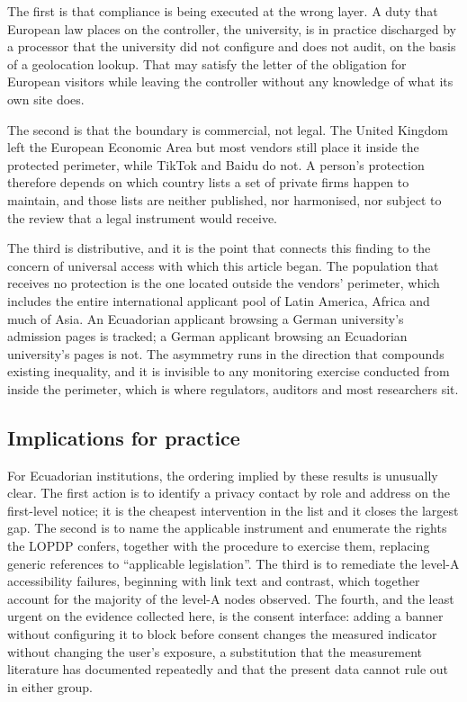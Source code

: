 \documentclass[pdflatex,sn-basic,Numbered]{sn-jnl}
\theoremstyle{thmstyleone}
\theoremstyle{thmstyletwo}
\theoremstyle{thmstylethree}
\begin{document}
The first is that compliance is being executed at the wrong layer. A duty that European law places on the controller, the university, is in practice discharged by a processor that the university did not configure and does not audit, on the basis of a geolocation lookup. That may satisfy the letter of the obligation for European visitors while leaving the controller without any knowledge of what its own site does.

The second is that the boundary is commercial, not legal. The United Kingdom left the European Economic Area but most vendors still place it inside the protected perimeter, while TikTok and Baidu do not. A person's protection therefore depends on which country lists a set of private firms happen to maintain, and those lists are neither published, nor harmonised, nor subject to the review that a legal instrument would receive.

The third is distributive, and it is the point that connects this finding to the concern of universal access with which this article began. The population that receives no protection is the one located outside the vendors' perimeter, which includes the entire international applicant pool of Latin America, Africa and much of Asia. An Ecuadorian applicant browsing a German university's admission pages is tracked; a German applicant browsing an Ecuadorian university's pages is not. The asymmetry runs in the direction that compounds existing inequality, and it is invisible to any monitoring exercise conducted from inside the perimeter, which is where regulators, auditors and most researchers sit.

\subsection{Implications for practice}\label{sec:discussion-practice}

For Ecuadorian institutions, the ordering implied by these results is unusually clear. The first action is to identify a privacy contact by role and address on the first-level notice; it is the cheapest intervention in the list and it closes the largest gap. The second is to name the applicable instrument and enumerate the rights the LOPDP confers, together with the procedure to exercise them, replacing generic references to ``applicable legislation''. The third is to remediate the level-A accessibility failures, beginning with link text and contrast, which together account for the majority of the level-A nodes observed. The fourth, and the least urgent on the evidence collected here, is the consent interface: adding a banner without configuring it to block before consent changes the measured indicator without changing the user's exposure, a substitution that the measurement literature has documented repeatedly \citep{sanchezrola2019can,bollinger2022automating} and that the present data cannot rule out in either group.
\end{document}
